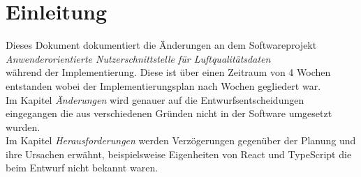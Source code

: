 \section{Einleitung}
Dieses Dokument dokumentiert die Änderungen an dem Softwareprojekt \\
\emph{Anwenderorientierte Nutzerschnittstelle für Luftqualitätsdaten}\\
während der Implementierung. Diese ist über einen Zeitraum von 4 Wochen entstanden wobei
der Implementierungsplan nach Wochen gegliedert war.\\

Im Kapitel \emph{Änderungen} wird genauer auf die Entwurfsentscheidungen eingegangen die 
aus verschiedenen Gründen nicht in der Software umgesetzt wurden.\\
Im Kapitel \emph{Herausforderungen} werden Verzögerungen gegenüber der Planung 
und ihre Ursachen erwähnt, beispielsweise Eigenheiten von React und TypeScript die beim
Entwurf nicht bekannt waren.
